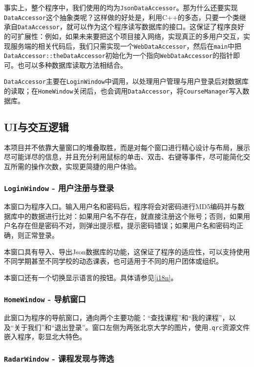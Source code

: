 \documentclass{article}
\begin{document}
事实上，整个程序中，我们使用的均为\texttt{JsonDataAccessor}。那为什么还要实现\texttt{DataAccessor}这个抽象类呢？这样做的好处是，利用C++的多态，只要一个类继承自\texttt{DataAccessor}，就可以作为这个程序读写数据库的接口。这保证了程序良好的可扩展性：例如，如果未来要把这个项目接入网络，实现真正的多用户交互，实现服务端的相关代码后，我们只需实现一个\texttt{WebDataAccessor}，然后在\texttt{main}中把\texttt{DataAccessor::theDataAccessor}初始化为一个指向\texttt{WebDataAccessor}的指针即可。也可以多种数据库读取方法相结合。

\texttt{DataAccessor}主要在\texttt{LoginWindow}中调用，以处理用户管理与用户登录后对数据库的读取；在\texttt{HomeWindow}关闭后，也会调用\texttt{DataAccessor}，将\texttt{CourseManager}写入数据库。


\subsection{UI与交互逻辑}

本项目并不依靠大量窗口的堆叠取胜，而是对每个窗口进行精心设计与布局，展示尽可能详尽的信息，并且充分利用鼠标的单击、双击、右键等事件，尽可能简化交互所需的操作次数，实现更简捷的用户体验。

\subsubsection{\texttt{LoginWindow} - 用户注册与登录}

本窗口为程序入口。输入用户名和密码后，程序将会对密码进行MD5编码并与数据库中的数据进行比对：如果用户名不存在，就直接注册这个账号；否则，如果用户名存在但是密码不对，则弹出提示框，提示密码错误；如果用户名和密码均正确，则正常登录。

本窗口具有导入、导出Json数据库的功能，这保证了程序的适应性，可以支持使用不同学期甚至不同学校的动态课表，也可适用于不同的用户团体或组织。

本窗口还有一个切换显示语言的按钮。具体请参见\ref{i18n}。

\subsubsection{\texttt{HomeWindow} - 导航窗口}

此窗口为程序的导航窗口，通向两个主要功能：“查找课程”和“我的课程”，以及“关于我们”和“退出登录”。窗口左侧为两张北京大学的图片，使用\texttt{.qrc}资源文件嵌入程序，彰显北大特色。

\subsubsection{\texttt{RadarWindow} - 课程发现与筛选}
\end{document}
